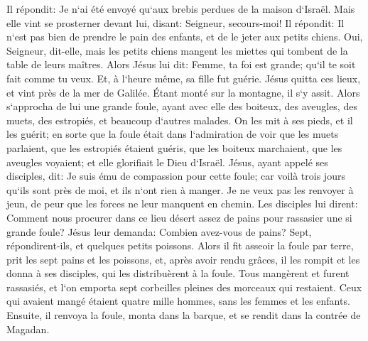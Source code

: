 \verse Il répondit: Je n`ai été envoyé qu`aux brebis perdues de la maison d`Israël. 
\verse Mais elle vint se prosterner devant lui, disant: Seigneur, secours-moi! 
\verse Il répondit: Il n`est pas bien de prendre le pain des enfants, et de le jeter aux petits chiens. 
\verse Oui, Seigneur, dit-elle, mais les petits chiens mangent les miettes qui tombent de la table de leurs maîtres. 
\verse Alors Jésus lui dit: Femme, ta foi est grande; qu`il te soit fait comme tu veux. Et, à l`heure même, sa fille fut guérie. 
\verse Jésus quitta ces lieux, et vint près de la mer de Galilée. Étant monté sur la montagne, il s`y assit. 
\verse Alors s`approcha de lui une grande foule, ayant avec elle des boiteux, des aveugles, des muets, des estropiés, et beaucoup d`autres malades. On les mit à ses pieds, et il les guérit; 
\verse en sorte que la foule était dans l`admiration de voir que les muets parlaient, que les estropiés étaient guéris, que les boiteux marchaient, que les aveugles voyaient; et elle glorifiait le Dieu d`Israël. 
\verse Jésus, ayant appelé ses disciples, dit: Je suis ému de compassion pour cette foule; car voilà trois jours qu`ils sont près de moi, et ils n`ont rien à manger. Je ne veux pas les renvoyer à jeun, de peur que les forces ne leur manquent en chemin. 
\verse Les disciples lui dirent: Comment nous procurer dans ce lieu désert assez de pains pour rassasier une si grande foule? 
\verse Jésus leur demanda: Combien avez-vous de pains? Sept, répondirent-ils, et quelques petits poissons. 
\verse Alors il fit asseoir la foule par terre, 
\verse prit les sept pains et les poissons, et, après avoir rendu grâces, il les rompit et les donna à ses disciples, qui les distribuèrent à la foule. 
\verse Tous mangèrent et furent rassasiés, et l`on emporta sept corbeilles pleines des morceaux qui restaient. 
\verse Ceux qui avaient mangé étaient quatre mille hommes, sans les femmes et les enfants. 
\verse Ensuite, il renvoya la foule, monta dans la barque, et se rendit dans la contrée de Magadan. 

